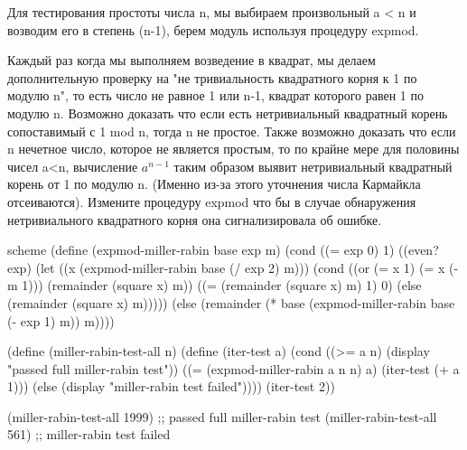 Для тестирования простоты числа n, мы выбираем произвольный a < n и возводим его в степень (n-1), берем модуль используя процедуру expmod.

Каждый раз когда мы выполняем возведение в квадрат, мы делаем дополнительную проверку на "не тривиальность квадратного корня к 1 по модулю n", то есть число не равное 1 или n-1, квадрат которого равен 1 по модулю n. Возможно доказать что если есть нетривиальный квадратный корень сопоставимый с 1 mod n, тогда n не простое. Также возможно доказать что если n нечетное число, которое не является простым, то по крайне мере для половины чисел a<n, вычисление $a^{n-1}$ таким образом выявит нетривиальный квадратный корень от 1 по модулю n. (Именно из-за этого уточнения числа Кармайкла отсеиваются).
Измените процедуру expmod что бы в случае обнаружения нетривиального квадратного корня она сигнализировала об ошибке.

\begin{codelisting}{scheme}
(define (expmod-miller-rabin base exp m)
  (cond ((= exp 0) 1)
        ((even? exp)
         (let ((x (expmod-miller-rabin base (/ exp 2) m)))
           (cond ((or (= x 1) (= x (- m 1))) (remainder (square x) m))
                 ((= (remainder (square x) m) 1) 0)
                 (else (remainder (square x) m)))))
        (else (remainder (* base (expmod-miller-rabin base (- exp 1) m))
                         m))))

(define (miller-rabin-test-all n)
  (define (iter-test a)
    (cond ((>= a n) (display "passed full miller-rabin test"))
          ((= (expmod-miller-rabin a n n) a) (iter-test (+ a 1)))
          (else (display "miller-rabin test failed"))))
  (iter-test 2))

(miller-rabin-test-all 1999) ;;  passed full miller-rabin test
(miller-rabin-test-all 561) ;;  miller-rabin test failed
\end{codelisting}